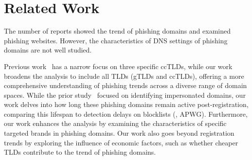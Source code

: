 \section{Related Work}
The number of reports showed the trend of phishing domains and examined phishing websites. However, the characteristics of DNS settings of phishing domains are not well studied.





Previous work~\cite{moura2024characterizing} has a narrow focus on three specific ccTLDs, while our work broadens the analysis to include all TLDs (gTLDs and ccTLDs), offering a more comprehensive understanding of phishing trends across a diverse range of domain spaces. 
While the prior study~\cite{moura2024characterizing} focused on identifying impersonated domains, our work delves into how long these phishing domains remain active post-registration, comparing this lifespan to detection delays on blocklists (\eg, APWG). 
Furthermore, our work enhances the analysis by examining the characteristics of specific targeted brands in phishing domains. 
Our work also goes beyond registration trends by exploring the influence of economic factors, such as whether cheaper TLDs contribute to the trend of phishing domains. 

